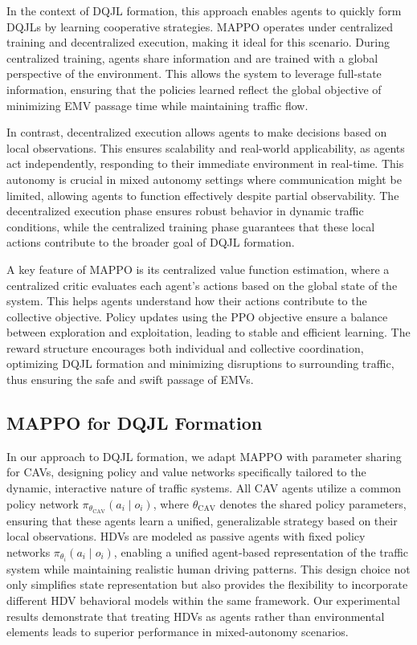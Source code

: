 In the context of DQJL formation, this approach enables agents to quickly form DQJLs by learning cooperative strategies. MAPPO operates under centralized training and decentralized execution, making it ideal for this scenario. During centralized training, agents share information and are trained with a global perspective of the environment. This allows the system to leverage full-state information, ensuring that the policies learned reflect the global objective of minimizing EMV passage time while maintaining traffic flow. 

In contrast, decentralized execution allows agents to make decisions based on local observations. This ensures scalability and real-world applicability, as agents act independently, responding to their immediate environment in real-time. This autonomy is crucial in mixed autonomy settings where communication might be limited, allowing agents to function effectively despite partial observability. The decentralized execution phase ensures robust behavior in dynamic traffic conditions, while the centralized training phase guarantees that these local actions contribute to the broader goal of DQJL formation.

A key feature of MAPPO is its centralized value function estimation, where a centralized critic evaluates each agent’s actions based on the global state of the system. This helps agents understand how their actions contribute to the collective objective. Policy updates using the PPO objective ensure a balance between exploration and exploitation, leading to stable and efficient learning. The reward structure encourages both individual and collective coordination, optimizing DQJL formation and minimizing disruptions to surrounding traffic, thus ensuring the safe and swift passage of EMVs.

\subsection{MAPPO for DQJL Formation}
\label{subsec:MAPPO_DQJL}
In our approach to DQJL formation, we adapt MAPPO with parameter sharing for CAVs, designing policy and value networks specifically tailored to the dynamic, interactive nature of traffic systems. All CAV agents utilize a common policy network \(\pi_{\theta_{\text{CAV}}}(a_i \mid o_i)\), where \(\theta_{\text{CAV}}\) denotes the shared policy parameters, ensuring that these agents learn a unified, generalizable strategy based on their local observations. HDVs are modeled as passive agents with fixed policy networks \(\pi_{\theta_i}(a_i \mid o_i)\), enabling a unified agent-based representation of the traffic system while maintaining realistic human driving patterns. This design choice not only simplifies state representation but also provides the flexibility to incorporate different HDV behavioral models within the same framework. Our experimental results demonstrate that treating HDVs as agents rather than environmental elements leads to superior performance in mixed-autonomy scenarios.

